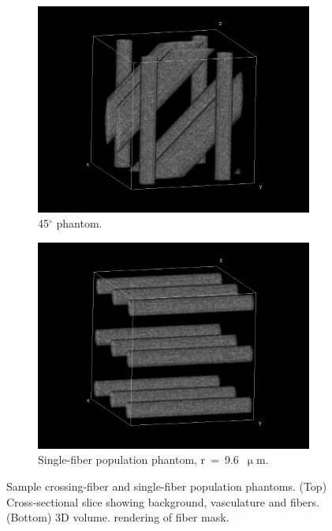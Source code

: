 \documentclass[11pt]{article}
\begin{document}
\begin{figure}[H]
\begin{subfigure}[t]{0.35\textwidth}
    \vspace{1em}
  \end{subfigure}
  \begin{subfigure}[t]{0.35\textwidth}
    \centering
    \includegraphics[width=0.95\linewidth]{figs/deg_45_volume}
    \caption{45$^{\circ}$ phantom.}
    \label{fig:deg45}
  \end{subfigure}
  \hspace{1em}
  \begin{subfigure}[t]{0.35\textwidth}
    \centering
    \includegraphics[width=0.95\linewidth]{figs/r8_volume}
    \caption{Single-fiber population phantom, r~=~9.6~$\upmu$m.}
    \label{fig:r8}
  \end{subfigure}
  \captionsetup{width=0.7\textwidth}
  \caption{Sample crossing-fiber and single-fiber population phantoms. (Top)
    Cross-sectional slice showing background, vasculature and fibers. (Bottom)
    3D volume. rendering of fiber mask.}
  \label{fig:phantoms}
\end{figure}
\end{document}
